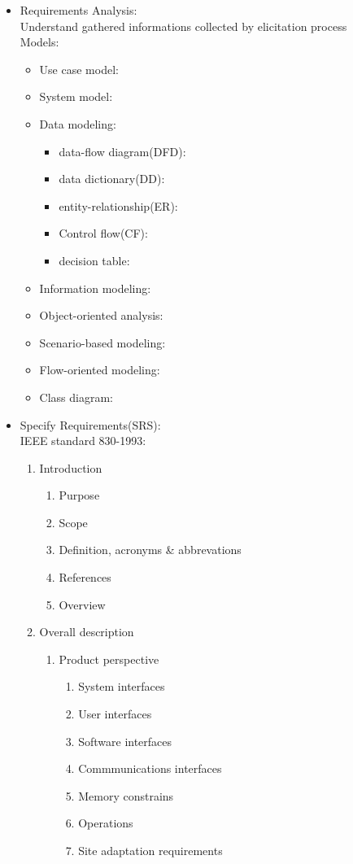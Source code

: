 \documentclass{article}
\begin{document}
\begin{enumerate}
\begin{itemize}
\begin{itemize}
				\end{itemize}
				\item Requirements Analysis:
				\\Understand gathered informations collected by elicitation process
				\\Models:
				\begin{itemize}
					\item Use case model: \item System model:
					\item Data modeling:
					\begin{itemize}
						\item data-flow diagram(DFD): \item data dictionary(DD): \item entity-relationship(ER): \item Control flow(CF): \item decision table:
					\end{itemize}
					\item Information modeling: \item Object-oriented analysis: \item Scenario-based modeling: \item Flow-oriented modeling: \item Class diagram:
				\end{itemize}
				\item Specify Requirements(SRS):
				\\IEEE standard 830-1993:
				\begin{enumerate}
					\item Introduction
					\begin{enumerate}
						\item Purpose \item Scope \item Definition, acronyms \& abbrevations \item References \item Overview
					\end{enumerate}
					\item Overall description
					\begin{enumerate}
						\item Product perspective
						\begin{enumerate}
							\item System interfaces \item User interfaces \item Software interfaces \item Commmunications interfaces \item Memory constrains \item Operations \item Site adaptation requirements

\end{enumerate}
\end{enumerate}
\end{enumerate}
\end{itemize}
\end{enumerate}
\end{document}
